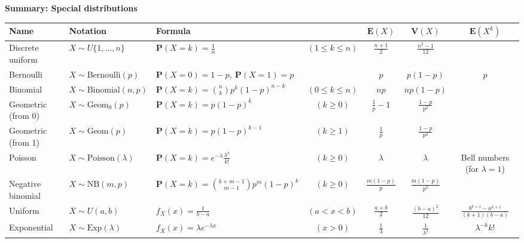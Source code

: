 \documentclass[12pt]{article}
\newcommand{\prob}{\mathbf{P}}
\theoremstyle{example}
\begin{document}
\begin{landscape}


\thispagestyle{empty}
\setlength\textwidth{10.0in}
\setlength\oddsidemargin{-0.2in}
\setlength\textheight{8.4in}
\setlength\topmargin{-0.9in}



\begin{center}

\hspace{-120.0pt}
{\large \textbf{Summary: Special distributions}} \\[4pt]


\hspace{-120.0pt}
\begin{tabular}{|l|l|lc|c|c|c|}
\hline
Name & Notation & Formula & & $\textbf{E}(X)$ & $\textbf{V}(X)$ & $\textbf{E}(X^k)$ \\
\hline
Discrete uniform & $X\sim U\{1,\ldots,n\}$ & $\prob(X=k) = \frac{1}{n}$ & $(1\le k\le n)$ & 
$\frac{n+1}{2}$
& $\frac{n^2-1}{12}$ & \\
Bernoulli & $X\sim \textrm{Bernoulli}(p)$ & $\prob(X=0)=1-p,\ \prob(X=1)=p$
&  & $p$ & $p(1-p)$ & $p$ \\
Binomial & $X\sim \textrm{Binomial}(n,p)$ & $\prob(X=k)=\binom{n}{k}p^k (1-p)^{n-k}$ & $(0\le k\le n)$
& $np$ & $np(1-p)$ & \\
Geometric (from 0) & $X\sim \textrm{Geom}_0(p)$ & $\prob(X=k)=p(1-p)^{k}$ & $(k\ge 0)$
& $\frac{1}{p}-1$& $\frac{1-p}{p^2}$& \\
Geometric (from 1) & $X\sim \textrm{Geom}(p)$ & $\prob(X=k)=p(1-p)^{k-1}$ & $(k\ge 1)$
& $\frac{1}{p}$& $\frac{1-p}{p^2}$ & \\
Poisson & $X\sim \textrm{Poisson}(\lambda)$ & $\prob(X=k)=e^{-\lambda} \frac{\lambda^k}{k!}$ & $(k\ge 0)$
& $\lambda$ & $\lambda$ & \textrm{\scriptsize Bell numbers (for $\lambda=1$)}\\
Negative binomial & $X\sim \textrm{NB}(m,p)$ & $\prob(X=k)=\binom{k+m-1}{m-1} p^m (1-p)^k$  & $(k\ge 0)$ 
& $\frac{m(1-p)}{p}$ & $\frac{m(1-p)}{p^2}$ & \\
\hline
Uniform & $X\sim U(a,b)$  & $f_X(x) = \frac{1}{b-a} $ & $(a<x<b)$
& $\frac{a+b}{2}$ & $\frac{(b-a)^2}{12}$ & $\frac{b^{k+1}-a^{k+1}}{(k+1)(b-a)}$ \\
Exponential & $X\sim \textrm{Exp}(\lambda)$ & $f_X(x) = \lambda e^{-\lambda x}$ & $(x>0)$
& $\frac{1}{\lambda}$ & $\frac{1}{\lambda^2}$ & $\lambda^{-k} k!$ \\

\end{tabular}
\end{center}
\end{landscape}
\end{document}
